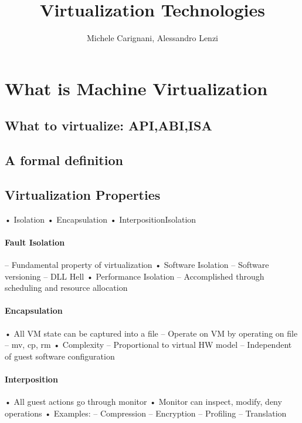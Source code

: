 \documentclass[10pt]{article}
\title{Virtualization Technologies}
\author{Michele Carignani, Alessandro Lenzi}
\begin{document}
\maketitle
\tableofcontents
\section{What is Machine Virtualization}

\subsection{What to virtualize: API,ABI,ISA}


\subsection{A formal definition}



\subsection{Virtualization Properties}

•  Isolation
•  Encapsulation
•  InterpositionIsolation


\paragraph{Fault Isolation}
–  Fundamental property of virtualization
•  Software Isolation
–  Software versioning
–  DLL Hell
•  Performance Isolation
–  Accomplished through scheduling and resource
allocation

\paragraph{Encapsulation}
•  All VM state can be captured into a file
–  Operate on VM by operating on file
–  mv, cp, rm
•  Complexity
–  Proportional to virtual HW model
–  Independent of guest software configuration

\paragraph{Interposition}
•  All guest actions go through monitor
•  Monitor can inspect, modify, deny
operations
•  Examples:
–  Compression
–  Encryption
–  Profiling
–  Translation
\end{document}
